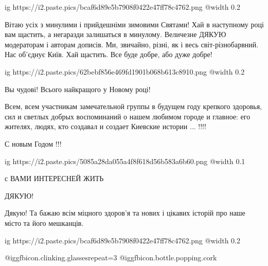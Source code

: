  
 
 
 
 
\zzSecCmt

\begin{itemize} %

\ifcmt
  ig https://i2.paste.pics/bcaf6d89e5b7908f0422e47ff78c4762.png
  @width 0.2
\fi


Вітаю усіх з минулими і прийдешніми зимовими Святами! Хай в наступному році вам
щастить, а негаразди залишаться в минулому. Величезне ДЯКУЮ модераторам і
авторам дописів. Ми, звичайно, різні, як і весь світ-різнобарвний. Нас об'єднує
Київ. Хай щастить. Все буде добре, або дуже добре!



\ifcmt
  ig https://i2.paste.pics/62bebf856e469fd1901b068b613c8910.png
  @width 0.2
\fi

Вы чудові! Всього найкращого у Новому році!


Всем, всем участникам замечательной группы в будущем году крепкого здоровья,
сил и светлых добрых воспоминаний о нашем любимом городе и главное: его
жителях, людях, кто создавал и создает Киевские истории ... !!!!

С новым Годом !!!


\ifcmt
  ig https://i2.paste.pics/5085a28da055a4f8f618d56b583a6b60.png
  @width 0.1
\fi


с ВАМИ ИНТЕРЕСНЕЙ ЖИТЬ

ДЯКУЮ!

Дякую! Та бажаю всім міцного здоров'я та нових і цікавих історій про наше місто та його мешканців.


\ifcmt
  ig https://i2.paste.pics/bcaf6d89e5b7908f0422e47ff78c4762.png
  @width 0.2
\fi

 @igg{fbicon.clinking.glasses}{repeat=3}  @igg{fbicon.bottle.popping.cork} 


\end{itemize}
